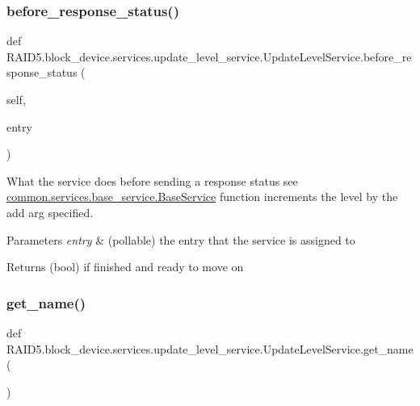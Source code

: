 \subsubsection{\texorpdfstring{before\+\_\+response\+\_\+status()}{before\_response\_status()}}
{\footnotesize\ttfamily def R\+A\+I\+D5.\+block\+\_\+device.\+services.\+update\+\_\+level\+\_\+service.\+Update\+Level\+Service.\+before\+\_\+response\+\_\+status (\begin{DoxyParamCaption}\item[{}]{self,  }\item[{}]{entry }\end{DoxyParamCaption})}



What the service does before sending a response status see \hyperlink{class_r_a_i_d5_1_1common_1_1services_1_1base__service_1_1_base_service}{common.\+services.\+base\+\_\+service.\+Base\+Service} function increments the level by the add arg specified. 


\begin{DoxyParams}{Parameters}
{\em entry} & (pollable) the entry that the service is assigned to \\
\hline
\end{DoxyParams}
\begin{DoxyReturn}{Returns}
(bool) if finished and ready to move on 
\end{DoxyReturn}
\mbox{\label{class_r_a_i_d5_1_1block__device_1_1services_1_1update__level__service_1_1_update_level_service_a3b15a64a007c7091c62be54243ddf44a}} 
\subsubsection{\texorpdfstring{get\+\_\+name()}{get\_name()}}
{\footnotesize\ttfamily def R\+A\+I\+D5.\+block\+\_\+device.\+services.\+update\+\_\+level\+\_\+service.\+Update\+Level\+Service.\+get\+\_\+name (\begin{DoxyParamCaption}{ }\end{DoxyParamCaption})\hspace{0.3cm}{\ttfamily [static]}}



